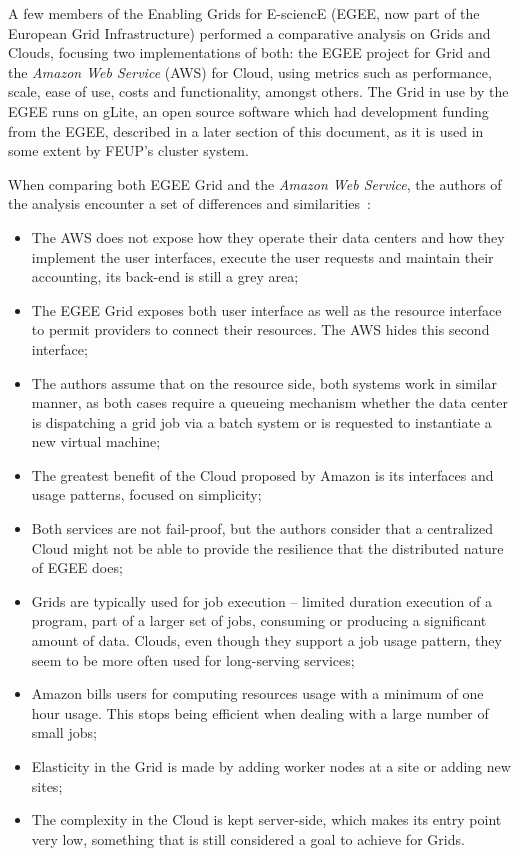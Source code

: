 A few members of the Enabling Grids for E-sciencE (EGEE, now part of the European Grid Infrastructure) performed a comparative analysis on Grids and Clouds, focusing two implementations of both: the EGEE project for Grid and the \textit{Amazon Web Service} (AWS) for Cloud, using metrics such as performance, scale, ease of use, costs and functionality, amongst others. The Grid in use by the EGEE runs on gLite, an open source software which had development funding from the EGEE, described in a later section of this document, as it is used in some extent by FEUP's cluster system.

When comparing both EGEE Grid and the \textit{Amazon Web Service}, the authors of the analysis encounter a set of differences and similarities~\cite{grids-and-clouds}:
\begin{itemize}
\item The AWS does not expose how they operate their data centers and how they implement the user interfaces, execute the user requests and maintain their accounting, its back-end is still a grey area;
\item The EGEE Grid exposes both user interface as well as the resource interface to permit providers to connect their resources. The AWS hides this second interface;
\item The authors assume that on the resource side, both systems work in similar manner, as both cases require a queueing mechanism whether the data center is dispatching a grid job via a batch system or is requested to instantiate a new virtual machine;
\item The greatest benefit of the Cloud proposed by Amazon is its interfaces and usage patterns, focused on simplicity;
\item Both services are not fail-proof, but the authors consider that a centralized Cloud might not be able to provide the resilience that the distributed nature of EGEE does;
\item Grids are typically used for job execution -- limited duration execution of a program, part of a larger set of jobs, consuming or producing a significant amount of data. Clouds, even though they support a job usage pattern, they seem to be more often used for long-serving services;
\item Amazon bills users for computing resources usage with a minimum of one hour usage. This stops being efficient when dealing with a large number of small jobs;
\item Elasticity in the Grid is made by adding worker nodes at a site or adding new sites;
\item The complexity in the Cloud is kept server-side, which makes its entry point very low, something that is still considered a goal to achieve for Grids. 
\end{itemize}


